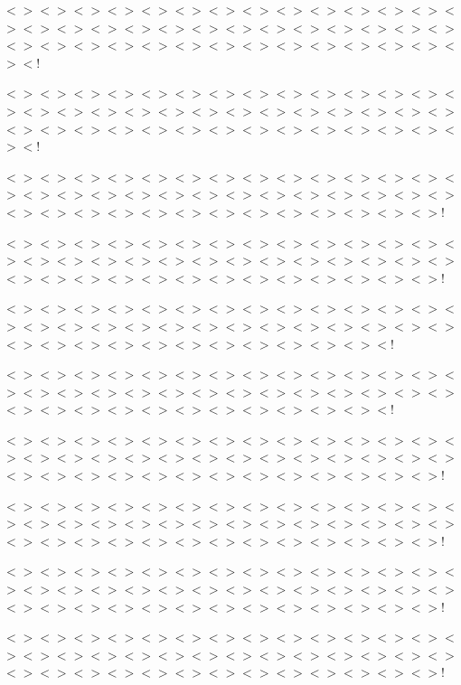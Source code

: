 $<$$>$$<$$>$$<$$>$$<$$>$$<$$>$$<$$>$$<$$>$$<$$>$$<$$>$$<$$>$$<$$>$$<$$>$$<$$>$$<$$>$$<$$>$$<$$>$$<$$>$$<$$>$$<$$>$$<$$>$$<$$>$$<$$>$$<$$>$$<$$>$$<$$>$$<$$>$$<$$>$$<$$>$$<$$>$$<$$>$$<$$>$$<$$>$$<$$>$$<$$>$$<$$>$$<$$>$$<$$>$$<$$>$$<$$>$$<$$>$$<$$>$$<$!

$<$$>$$<$$>$$<$$>$$<$$>$$<$$>$$<$$>$$<$$>$$<$$>$$<$$>$$<$$>$$<$$>$$<$$>$$<$$>$$<$$>$$<$$>$$<$$>$$<$$>$$<$$>$$<$$>$$<$$>$$<$$>$$<$$>$$<$$>$$<$$>$$<$$>$$<$$>$$<$$>$$<$$>$$<$$>$$<$$>$$<$$>$$<$$>$$<$$>$$<$$>$$<$$>$$<$$>$$<$$>$$<$$>$$<$$>$$<$$>$$<$$>$$<$!

$<$$>$$<$$>$$<$$>$$<$$>$$<$$>$$<$$>$$<$$>$$<$$>$$<$$>$$<$$>$$<$$>$$<$$>$$<$$>$$<$$>$$<$$>$$<$$>$$<$$>$$<$$>$$<$$>$$<$$>$$<$$>$$<$$>$$<$$>$$<$$>$$<$$>$$<$$>$$<$$>$$<$$>$$<$$>$$<$$>$$<$$>$$<$$>$$<$$>$$<$$>$$<$$>$$<$$>$$<$$>$$<$$>$$<$$>$$<$$>$!

$<$$>$$<$$>$$<$$>$$<$$>$$<$$>$$<$$>$$<$$>$$<$$>$$<$$>$$<$$>$$<$$>$$<$$>$$<$$>$$<$$>$$<$$>$$<$$>$$<$$>$$<$$>$$<$$>$$<$$>$$<$$>$$<$$>$$<$$>$$<$$>$$<$$>$$<$$>$$<$$>$$<$$>$$<$$>$$<$$>$$<$$>$$<$$>$$<$$>$$<$$>$$<$$>$$<$$>$$<$$>$$<$$>$$<$$>$$<$$>$!

$<$$>$$<$$>$$<$$>$$<$$>$$<$$>$$<$$>$$<$$>$$<$$>$$<$$>$$<$$>$$<$$>$$<$$>$$<$$>$$<$$>$$<$$>$$<$$>$$<$$>$$<$$>$$<$$>$$<$$>$$<$$>$$<$$>$$<$$>$$<$$>$$<$$>$$<$$>$$<$$>$$<$$>$$<$$>$$<$$>$$<$$>$$<$$>$$<$$>$$<$$>$$<$$>$$<$$>$$<$$>$$<$$>$$<$!

$<$$>$$<$$>$$<$$>$$<$$>$$<$$>$$<$$>$$<$$>$$<$$>$$<$$>$$<$$>$$<$$>$$<$$>$$<$$>$$<$$>$$<$$>$$<$$>$$<$$>$$<$$>$$<$$>$$<$$>$$<$$>$$<$$>$$<$$>$$<$$>$$<$$>$$<$$>$$<$$>$$<$$>$$<$$>$$<$$>$$<$$>$$<$$>$$<$$>$$<$$>$$<$$>$$<$$>$$<$$>$$<$$>$$<$!

$<$$>$$<$$>$$<$$>$$<$$>$$<$$>$$<$$>$$<$$>$$<$$>$$<$$>$$<$$>$$<$$>$$<$$>$$<$$>$$<$$>$$<$$>$$<$$>$$<$$>$$<$$>$$<$$>$$<$$>$$<$$>$$<$$>$$<$$>$$<$$>$$<$$>$$<$$>$$<$$>$$<$$>$$<$$>$$<$$>$$<$$>$$<$$>$$<$$>$$<$$>$$<$$>$$<$$>$$<$$>$$<$$>$$<$$>$$<$$>$!

$<$$>$$<$$>$$<$$>$$<$$>$$<$$>$$<$$>$$<$$>$$<$$>$$<$$>$$<$$>$$<$$>$$<$$>$$<$$>$$<$$>$$<$$>$$<$$>$$<$$>$$<$$>$$<$$>$$<$$>$$<$$>$$<$$>$$<$$>$$<$$>$$<$$>$$<$$>$$<$$>$$<$$>$$<$$>$$<$$>$$<$$>$$<$$>$$<$$>$$<$$>$$<$$>$$<$$>$$<$$>$$<$$>$$<$$>$$<$$>$!

$<$$>$$<$$>$$<$$>$$<$$>$$<$$>$$<$$>$$<$$>$$<$$>$$<$$>$$<$$>$$<$$>$$<$$>$$<$$>$$<$$>$$<$$>$$<$$>$$<$$>$$<$$>$$<$$>$$<$$>$$<$$>$$<$$>$$<$$>$$<$$>$$<$$>$$<$$>$$<$$>$$<$$>$$<$$>$$<$$>$$<$$>$$<$$>$$<$$>$$<$$>$$<$$>$$<$$>$$<$$>$$<$$>$$<$$>$$<$$>$!

$<$$>$$<$$>$$<$$>$$<$$>$$<$$>$$<$$>$$<$$>$$<$$>$$<$$>$$<$$>$$<$$>$$<$$>$$<$$>$$<$$>$$<$$>$$<$$>$$<$$>$$<$$>$$<$$>$$<$$>$$<$$>$$<$$>$$<$$>$$<$$>$$<$$>$$<$$>$$<$$>$$<$$>$$<$$>$$<$$>$$<$$>$$<$$>$$<$$>$$<$$>$$<$$>$$<$$>$$<$$>$$<$$>$$<$$>$$<$$>$! 

